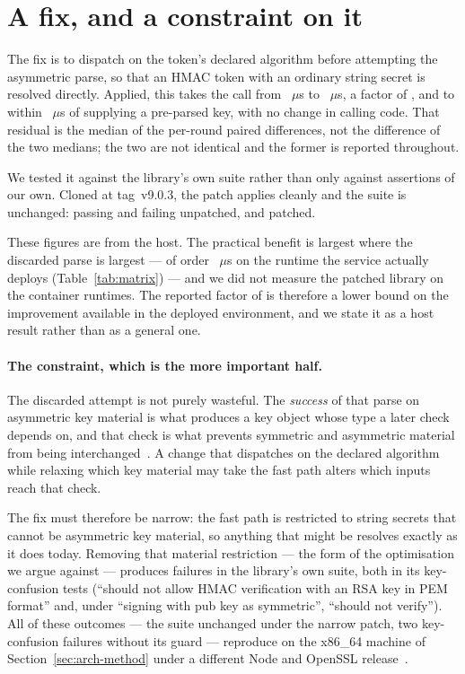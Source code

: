 \documentclass[pdflatex,sn-basic,twocolumn]{sn-jnl}%
\newcommand{\LibraryTag}{tag~v9.0.3}
\newcommand{\NaiveFailingTests}{``should not allow HMAC verification with an RSA
key in PEM format'' and, under ``signing with pub key as symmetric'', ``should
not verify''}
\begin{document}
\section{A fix, and a constraint on it}\label{sec:fix}

The fix is to dispatch on the token's declared algorithm before attempting the
asymmetric parse, so that an HMAC token with an ordinary string secret is
resolved directly. Applied, this takes the call from \HostJwtString~$\mu$s to
\HostJwtStringSafe~$\mu$s, a factor of \HostSafePatchRatio, and to within
\HostSafePatchResidual~$\mu$s of supplying a pre-parsed key, with no change in
calling code. That residual is the median of the per-round paired differences,
not the difference of the two medians; the two are not identical and the former
is reported throughout.

We tested it against the library's own suite rather than only against assertions
of our own. Cloned at \LibraryTag, the patch applies cleanly and the suite is
unchanged: \SuiteStockPassing{} passing and \SuiteStockFailing{} failing
unpatched, \SuitePatchedPassing{} and \SuitePatchedFailing{} patched.

These figures are from the host. The practical benefit is largest where the
discarded parse is largest --- of order \NodeEighteenProbeThrows~$\mu$s on the
runtime the service actually deploys (Table~\ref{tab:matrix}) --- and we did not
measure the patched library on the container runtimes. The reported factor of
\HostSafePatchRatio{} is therefore a lower bound on the improvement available in
the deployed environment, and we state it as a host result rather than as a
general one.

\paragraph{The constraint, which is the more important half.} The discarded
attempt is not purely wasteful. The \emph{success} of that parse on asymmetric
key material is what produces a key object whose type a later check depends on,
and that check is what prevents symmetric and asymmetric material from being
interchanged~\citep{rfc8725}. A change that dispatches on the declared algorithm
while relaxing which key material may take the fast path alters which inputs
reach that check.

The fix must therefore be narrow: the fast path is restricted to string secrets
that cannot be asymmetric key material, so anything that might be resolves
exactly as it does today. Removing that material restriction --- the form of the
optimisation we argue against --- produces \SuiteNaiveFailing{} failures in the
library's own suite, both in its key-confusion tests
(\NaiveFailingTests). All of these outcomes --- the suite unchanged under the
narrow patch, two key-confusion failures without its guard --- reproduce on the
x86\_64 machine of Section~\ref{sec:arch-method} under a different Node and
OpenSSL release~\citep{artifact2026}.
\end{document}
